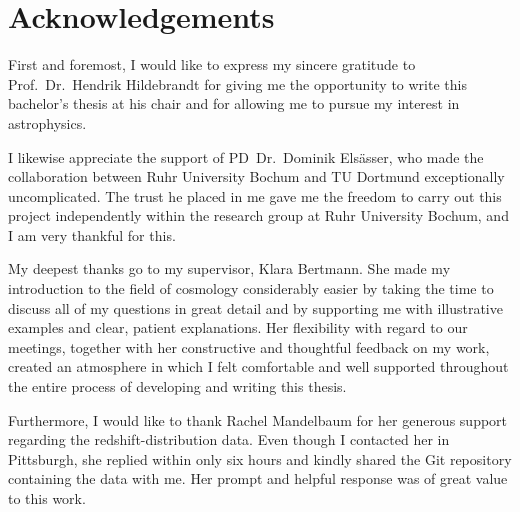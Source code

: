 \chapter*{Acknowledgements}

First and foremost, I would like to express my sincere gratitude to Prof.~Dr.~Hendrik
Hildebrandt for giving me the opportunity to write this bachelor's thesis at his chair
and for allowing me to pursue my interest in astrophysics.

I likewise appreciate the support of PD~Dr.~Dominik Elsässer, who made the collaboration
between Ruhr University Bochum and TU Dortmund exceptionally uncomplicated. The trust
he placed in me gave me the freedom to carry out this project independently within the
research group at Ruhr University Bochum, and I am very thankful for this.

My deepest thanks go to my supervisor, Klara Bertmann. She made my introduction to the
field of cosmology considerably easier by taking the time to discuss all of my questions
in great detail and by supporting me with illustrative examples and clear, patient
explanations. Her flexibility with regard to our meetings, together with her
constructive and thoughtful feedback on my work, created an atmosphere in which I felt
comfortable and well supported throughout the entire process of developing and writing
this thesis.

Furthermore, I would like to thank Rachel Mandelbaum for her generous support
regarding the redshift-distribution data. Even though I contacted her in Pittsburgh,
she replied within only six hours and kindly shared the Git repository containing the
data with me. Her prompt and helpful response was of great value to this work.